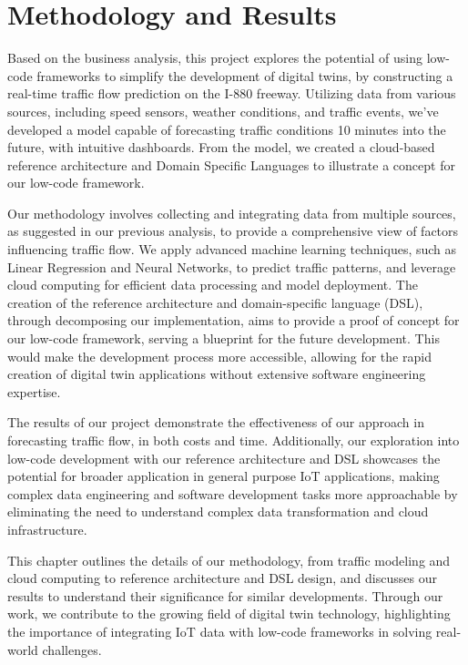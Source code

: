 \chapter{Methodology and Results}
Based on the business analysis, this project explores the potential of using low-code frameworks to simplify the development of digital twins, by constructing a real-time traffic flow prediction on the I-880 freeway. Utilizing data from various sources, including speed sensors, weather conditions, and traffic events, we've developed a model capable of forecasting traffic conditions 10 minutes into the future, with intuitive dashboards. From the model, we created a cloud-based reference architecture and Domain Specific Languages to illustrate a concept for our low-code framework.

Our methodology involves collecting and integrating data from multiple sources, as suggested in our previous analysis, to provide a comprehensive view of factors influencing traffic flow. We apply advanced machine learning techniques, such as Linear Regression and Neural Networks, to predict traffic patterns, and leverage cloud computing for efficient data processing and model deployment. The creation of the reference architecture and domain-specific language (DSL), through decomposing our implementation, aims to provide a proof of concept for our low-code framework, serving a blueprint for the future development. This would make the development process more accessible, allowing for the rapid creation of digital twin applications without extensive software engineering expertise.

The results of our project demonstrate the effectiveness of our approach in forecasting traffic flow, in both costs and time. Additionally, our exploration into low-code development with our reference architecture and DSL showcases the potential for broader application in general purpose IoT applications, making complex data engineering and software development tasks more approachable by eliminating the need to understand complex data transformation and cloud infrastructure.

This chapter outlines the details of our methodology, from traffic modeling and cloud computing to reference architecture and DSL design, and discusses our results to understand their significance for similar developments. Through our work, we contribute to the growing field of digital twin technology, highlighting the importance of integrating IoT data with low-code frameworks in solving real-world challenges.

